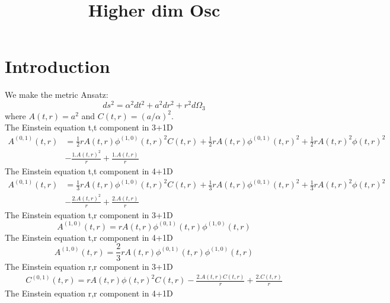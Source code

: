 \documentclass{article}
\begin{document}
\title{Higher dim Osc}


\maketitle


\section{Introduction}
We make the metric Ansatz: 
\begin{equation}
ds^2 = \alpha^2 dt^2+a^2 dr^2 + r^2 d\Omega_{3}
\end{equation}
where $A(t,r) = a^2$ and $C(t,r) = (a/\alpha)^2 $. \\  
The Einstein equation t,t component in 3+1D
\begin{equation}
    \label{KG Equation }
    \begin{split}
   A^{(0,1)}(t,r) & =\frac{1}{2} r A(t,r) \phi^{(1,0)}(t,r)^2 C(t,r)+\frac{1}{2} r A(t,r) \phi^{(0,1)}(t,r)^2+\frac{1}{2} r A(t,r)^2 \phi(t,r)^2 \\ &-\frac{1. A(t,r)^2}{r}+\frac{1. A(t,r)}{r}
	\end{split}
\end{equation}
The Einstein equation t,t component in 4+1D
\begin{equation}
\begin{split}
A^{(0,1)}(t,r)&=\frac{1}{3} r A(t,r) \phi^{(1,0)}(t,r)^2 C(t,r)+\frac{1}{3}r A(t,r) \phi^{(0,1)}(t,r)^2+\frac{1}{3} r A(t,r)^2 \phi(t,r)^2 \\ &-\frac{2. A(t,r)^2}{r}+\frac{2. A(t,r)}{r}
	\end{split}
\end{equation}
The Einstein equation t,r component in 3+1D
\begin{equation}
A^{(1,0)}(t,r)=r A(t,r) \phi^{(0,1)}(t,r) \phi^{(1,0)}(t,r)
\end{equation}
The Einstein equation t,r component in 4+1D
\begin{equation}
A^{(1,0)}(t,r)=\frac{2}{3} r A(t,r) \phi^{(0,1)}(t,r) \phi^{(1,0)}(t,r)
\end{equation}
The Einstein equation r,r component in 3+1D
\begin{equation}
\begin{split}
C^{(0,1)}(t,r)=  r A(t,r) \phi(t,r)^2 C(t,r)-\frac{2. A(t,r) C(t,r)}{r}+\frac{2. C(t,r)}{r}
\end{split}
\end{equation}
The Einstein equation r,r component in 4+1D
\end{document}
